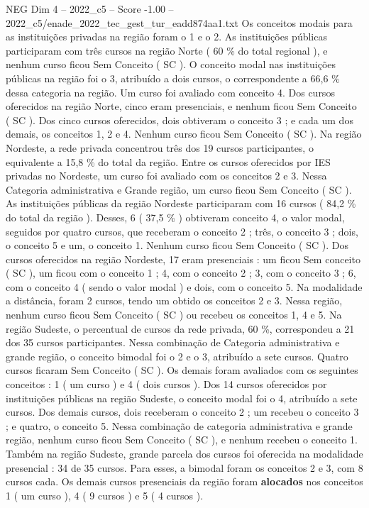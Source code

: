 \begin{textsample}{NEG Dim 4 – 2022\_c5 – Score -1.00 – 2022\_c5/enade\_2022\_tec\_gest\_tur\_eadd874aa1.txt}
Os conceitos modais para as instituições privadas na região foram o 1 e o 2.
As instituições públicas participaram com três cursos na região Norte ( 60 \% do total regional ), e nenhum curso ficou Sem Conceito ( SC ).
O conceito modal nas instituições públicas na região foi o 3, atribuído a dois cursos, o correspondente a 66,6 \% dessa categoria na região.
Um curso foi avaliado com conceito 4.
Dos cursos oferecidos na região Norte, cinco eram presenciais, e nenhum ficou Sem Conceito ( SC ).
Dos cinco cursos oferecidos, dois obtiveram o conceito 3 ; e cada um dos demais, os conceitos 1, 2 e 4.
Nenhum curso ficou Sem Conceito ( SC ).
Na região Nordeste, a rede privada concentrou três dos 19 cursos participantes, o equivalente a 15,8 \% do total da região.
Entre os cursos oferecidos por IES privadas no Nordeste, um curso foi avaliado com os conceitos 2 e 3.
Nessa Categoria administrativa e Grande região, um curso ficou Sem Conceito ( SC ).
As instituições públicas da região Nordeste participaram com 16 cursos ( 84,2 \% do total da região ).
Desses, 6 ( 37,5 \% ) obtiveram conceito 4, o valor modal, seguidos por quatro cursos, que receberam o conceito 2 ; três, o conceito 3 ; dois, o conceito 5 e um, o conceito 1.
Nenhum curso ficou Sem Conceito ( SC ).
Dos cursos oferecidos na região Nordeste, 17 eram presenciais : um ficou Sem conceito ( SC ), um ficou com o conceito 1 ; 4, com o conceito 2 ; 3, com o conceito 3 ; 6, com o conceito 4 ( sendo o valor modal ) e dois, com o conceito 5.
Na modalidade a distância, foram 2 cursos, tendo um obtido os conceitos 2 e 3.
Nessa região, nenhum curso ficou Sem Conceito ( SC ) ou recebeu os conceitos 1, 4 e 5.
Na região Sudeste, o percentual de cursos da rede privada, 60 \%, correspondeu a 21 dos 35 cursos participantes.
Nessa combinação de Categoria administrativa e grande região, o conceito bimodal foi o 2 e o 3, atribuído a sete cursos.
Quatro cursos ficaram Sem Conceito ( SC ).
Os demais foram avaliados com os seguintes conceitos : 1 ( um curso ) e 4 ( dois cursos ).
Dos 14 cursos oferecidos por instituições públicas na região Sudeste, o conceito modal foi o 4, atribuído a sete cursos.
Dos demais cursos, dois receberam o conceito 2 ; um recebeu o conceito 3 ; e quatro, o conceito 5.
Nessa combinação de categoria administrativa e grande região, nenhum curso ficou Sem Conceito ( SC ), e nenhum recebeu o conceito 1.
Também na região Sudeste, grande parcela dos cursos foi oferecida na modalidade presencial : 34 de 35 cursos.
Para esses, a bimodal foram os conceitos 2 e 3, com 8 cursos cada.
Os demais cursos presenciais da região foram \textbf{alocados} nos conceitos 1 ( um curso ), 4 ( 9 cursos ) e 5 ( 4 cursos ).

\end{textsample}

